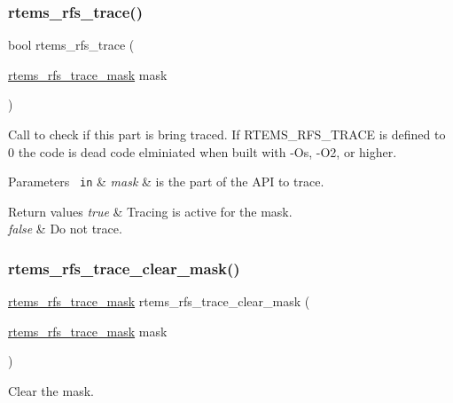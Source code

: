 \subsubsection{\texorpdfstring{rtems\_rfs\_trace()}{rtems\_rfs\_trace()}}
{\footnotesize\ttfamily bool rtems\+\_\+rfs\+\_\+trace (\begin{DoxyParamCaption}\item[{\mbox{\hyperlink{rtems-rfs-trace_8h_a9428edf7367b99bacef5e6d985540cae}{rtems\+\_\+rfs\+\_\+trace\+\_\+mask}}}]{mask }\end{DoxyParamCaption})}

Call to check if this part is bring traced. If R\+T\+E\+M\+S\+\_\+\+R\+F\+S\+\_\+\+T\+R\+A\+CE is defined to 0 the code is dead code elminiated when built with -\/Os, -\/O2, or higher.


\begin{DoxyParams}[1]{Parameters}
\mbox{\texttt{ in}}  & {\em mask} & is the part of the A\+PI to trace.\\
\hline
\end{DoxyParams}

\begin{DoxyRetVals}{Return values}
{\em true} & Tracing is active for the mask. \\
\hline
{\em false} & Do not trace. \\
\hline
\end{DoxyRetVals}
\mbox{\label{rtems-rfs-trace_8h_af9ffa9ff2496f9237093929f0a54a688}} 
\subsubsection{\texorpdfstring{rtems\_rfs\_trace\_clear\_mask()}{rtems\_rfs\_trace\_clear\_mask()}}
{\footnotesize\ttfamily \mbox{\hyperlink{rtems-rfs-trace_8h_a9428edf7367b99bacef5e6d985540cae}{rtems\+\_\+rfs\+\_\+trace\+\_\+mask}} rtems\+\_\+rfs\+\_\+trace\+\_\+clear\+\_\+mask (\begin{DoxyParamCaption}\item[{\mbox{\hyperlink{rtems-rfs-trace_8h_a9428edf7367b99bacef5e6d985540cae}{rtems\+\_\+rfs\+\_\+trace\+\_\+mask}}}]{mask }\end{DoxyParamCaption})}

Clear the mask.


